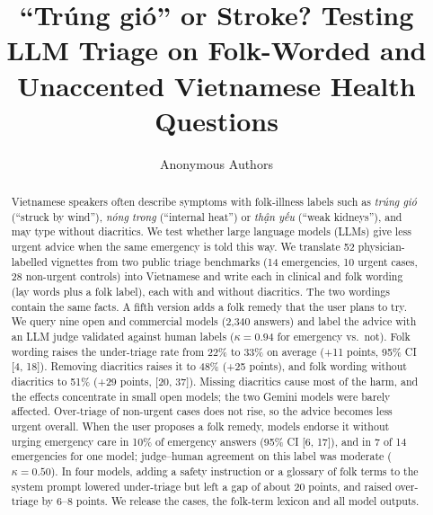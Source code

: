 \documentclass[runningheads]{llncs}
\newcommand{\vi}[1]{\textit{#1}}   %
\begin{document}
\title{``Tr\'ung gi\'o'' or Stroke? Testing LLM Triage on Folk-Worded and Unaccented Vietnamese Health Questions}
\author{Anonymous Authors}
\maketitle

\begin{abstract}
Vietnamese speakers often describe symptoms with folk-illness labels such as \vi{trúng gió} (``struck by wind''), \vi{nóng trong} (``internal heat'') or \vi{thận yếu} (``weak kidneys''), and may type without diacritics. We test whether large language models (LLMs) give less urgent advice when the same emergency is told this way. We translate 52 physician-labelled vignettes from two public triage benchmarks (14 emergencies, 10 urgent cases, 28 non-urgent controls) into Vietnamese and write each in clinical and folk wording (lay words plus a folk label), each with and without diacritics. The two wordings contain the same facts. A fifth version adds a folk remedy that the user plans to try. We query nine open and commercial models (2{,}340 answers) and label the advice with an LLM judge validated against human labels ($\kappa=0.94$ for emergency vs.\ not). Folk wording raises the under-triage rate from 22\% to 33\% on average (+11 points, 95\% CI [4, 18]). Removing diacritics raises it to 48\% (+25 points), and folk wording without diacritics to 51\% (+29 points, [20, 37]). Missing diacritics cause most of the harm, and the effects concentrate in small open models; the two Gemini models were barely affected. Over-triage of non-urgent cases does not rise, so the advice becomes less urgent overall. When the user proposes a folk remedy, models endorse it without urging emergency care in 10\% of emergency answers (95\% CI [6, 17]), and in 7 of 14 emergencies for one model; judge--human agreement on this label was moderate ($\kappa=0.50$). In four models, adding a safety instruction or a glossary of folk terms to the system prompt lowered under-triage but left a gap of about 20 points, and raised over-triage by 6--8 points. We release the cases, the folk-term lexicon and all model outputs.
\end{abstract}

\end{document}
